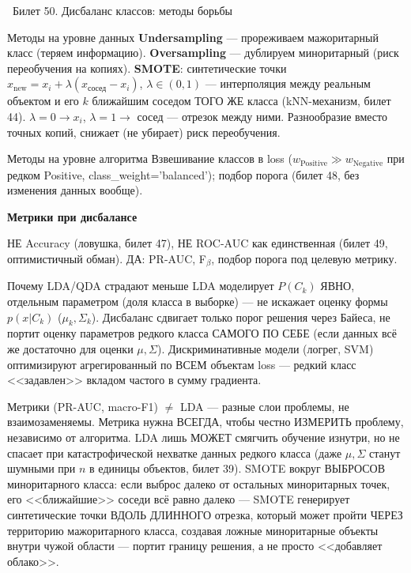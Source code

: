 \documentclass[12pt, a4paper]{article}
\newcommand{\bilet}[2]{%
  \vspace{10pt}%
  \noindent\colorbox{qcolor}{\parbox{\dimexpr\linewidth-2\fboxsep\relax}{%
    \color{white}\large\bfseries\strut\ Билет #1. #2%
  }}%
  \nopagebreak\vspace{5pt}\par\nopagebreak%
}
\newcommand{\qsub}[1]{%
  \vspace{5pt}%
  {\bfseries\color{defblue} #1}%
  \par\vspace{2pt}%
}
\begin{document}
\bilet{50}{Дисбаланс классов: методы борьбы}

\begin{defbox}{Методы на уровне данных}
\textbf{Undersampling} --- прореживаем мажоритарный класс (теряем информацию). \textbf{Oversampling} --- дублируем миноритарный (риск переобучения на копиях). \textbf{SMOTE}: синтетические точки $x_{\text{new}}=x_i+\lambda(x_{\text{сосед}}-x_i)$, $\lambda\in(0,1)$ --- интерполяция между реальным объектом и его $k$ ближайшим соседом ТОГО ЖЕ класса (kNN-механизм, билет 44). $\lambda{=}0\to x_i$, $\lambda{=}1\to$ сосед --- отрезок между ними. Разнообразие вместо точных копий, снижает (не убирает) риск переобучения.
\end{defbox}

\begin{defbox}{Методы на уровне алгоритма}
Взвешивание классов в loss ($w_{\text{Positive}}\gg w_{\text{Negative}}$ при редком Positive, class\_weight='balanced'); подбор порога (билет 48, без изменения данных вообще).
\end{defbox}

\qsub{Метрики при дисбалансе}
НЕ Accuracy (ловушка, билет 47), НЕ ROC-AUC как единственная (билет 49, оптимистичный обман). ДА: PR-AUC, F$_\beta$, подбор порога под целевую метрику.

\begin{propbox}{Почему LDA/QDA страдают меньше}
LDA моделирует $P(C_k)$ ЯВНО, отдельным параметром (доля класса в выборке) --- не искажает оценку формы $p(x|C_k)$ ($\mu_k,\Sigma_k$). Дисбаланс сдвигает только порог решения через Байеса, не портит оценку параметров редкого класса САМОГО ПО СЕБЕ (если данных всё же достаточно для оценки $\mu,\Sigma$). Дискриминативные модели (логрег, SVM) оптимизируют агрегированный по ВСЕМ объектам loss --- редкий класс <<задавлен>> вкладом частого в сумму градиента.
\end{propbox}

\begin{fishkabox}
Метрики (PR-AUC, macro-F1) $\ne$ LDA --- разные слои проблемы, не взаимозаменяемы. Метрика нужна ВСЕГДА, чтобы честно ИЗМЕРИТЬ проблему, независимо от алгоритма. LDA лишь МОЖЕТ смягчить обучение изнутри, но не спасает при катастрофической нехватке данных редкого класса (даже $\mu,\Sigma$ станут шумными при $n$ в единицы объектов, билет 39).
SMOTE вокруг ВЫБРОСОВ миноритарного класса: если выброс далеко от остальных миноритарных точек, его <<ближайшие>> соседи всё равно далеко --- SMOTE генерирует синтетические точки ВДОЛЬ ДЛИННОГО отрезка, который может пройти ЧЕРЕЗ территорию мажоритарного класса, создавая ложные миноритарные объекты внутри чужой области --- портит границу решения, а не просто <<добавляет облако>>.
\end{fishkabox}
\end{document}
